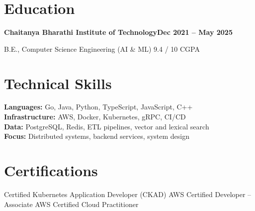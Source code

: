 \documentclass[letterpaper,10pt]{article}
\newcommand{\org}[2]{%
  \textbf{#1}\hfill\textbf{#2}\par\vspace{0.1em}%
}
\begin{document}
\section{Education}

\org{Chaitanya Bharathi Institute of Technology}{Dec 2021 -- May 2025}
B.E., Computer Science Engineering (AI \& ML) \textbullet{} 9.4 / 10 CGPA

\section{Technical Skills}

\textbf{Languages:} Go, Java, Python, TypeScript, JavaScript, C++\\[0.2em]
\textbf{Infrastructure:} AWS, Docker, Kubernetes, gRPC, CI/CD\\[0.2em]
\textbf{Data:} PostgreSQL, Redis, ETL pipelines, vector and lexical search\\[0.2em]
\textbf{Focus:} Distributed systems, backend services, system design

\section{Certifications}

Certified Kubernetes Application Developer (CKAD) \textbullet{} AWS Certified Developer --
Associate \textbullet{} AWS Certified Cloud Practitioner
\end{document}
